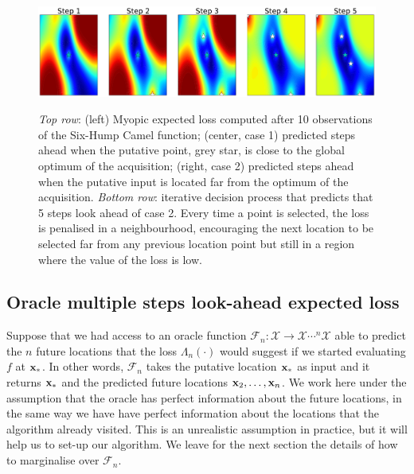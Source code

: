 \documentclass[twoside]{article}
\newcommand{\future}{\mathcal{F}}
\begin{document}
\begin{figure}[t!]
\begin{center}\label{fig:steps_ahead}
\includegraphics[width=16cm]{steps.pdf}
\end{center}\caption{\emph{Top row}: (left) Myopic expected loss computed after 10 observations of the Six-Hump Camel function; (center, case 1) predicted steps ahead when the putative point, grey star, is close to the global optimum of the acquisition; (right, case 2) predicted steps ahead when the putative input is located far from the optimum of the acquisition. \emph{Bottom row}: iterative decision process that predicts that 5 steps look ahead of case 2. Every time a point is selected, the loss is penalised in a neighbourhood, encouraging the next location to be selected far from any previous location point but still in a region where the value of the loss is low.}
\end{figure}

\subsection{Oracle multiple steps look-ahead expected loss}



Suppose that  we had access to an oracle function $\future_{n}: {\mathcal X}\rightarrow  {\mathcal X}\cdots^{n} {\mathcal X}$ able to predict the $n$ future  locations that the loss $\Lambda_n(\cdot)$ would suggest if we started evaluating $f$ at $\mathbf{x}_*$. In other words, $\future_{n}$ takes the putative location $\mathbf{x}_*$ as input and it returns $\mathbf{x}_*$ and the predicted future locations  $\mathbf{x}_2,\dots, \mathbf{x}_n$. We work here under the assumption that the oracle has perfect information about the future locations, in the same way we have have perfect information about the locations that the algorithm already visited. This is an unrealistic assumption in practice, but it will help us to set-up our algorithm. We leave for the next section the details of how to marginalise over $\future_{n}$. 
\end{document}
